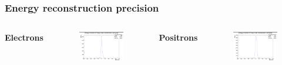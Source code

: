 \documentclass{beamer}
\begin{document}
	\begin{frame}
		\frametitle{Energy reconstruction precision}
		\begin{columns}
			\centering
			\Large \textbf{Electrons}
			\begin{figure}
				\centering
				\includegraphics[width = 0.95 \linewidth]{../images/c_e_delta_energy.png}
			\end{figure}
			\centering
			\Large \textbf{Positrons}
			\begin{figure}
				\centering
				\includegraphics[width = 0.95 \linewidth]{../images/c_p_delta_energy.png}
			\end{figure}
		\end{columns}
	\end{frame}
	
\end{document}
